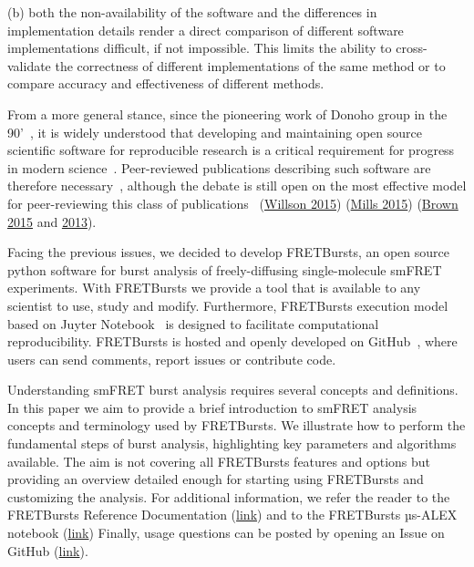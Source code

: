 (b) both the non-availability of the software and the differences in implementation 
details render a direct comparison of different software implementations difficult, 
if not impossible. 
This limits the ability to cross-validate the correctness of different 
implementations of the same method or to compare accuracy and effectiveness
of different methods.

From a more general stance, since the pioneering work of Donoho group in the 90'~\cite{Buckheit_1995}, 
it is widely understood that developing and maintaining open source scientific software
for reproducible research is a critical requirement for progress in modern 
science~\cite{Ince_2012,Vihinen_2015}. Peer-reviewed publications describing such software are therefore necessary~\cite{Pradal_2013}, 
although the debate is still open on the most effective model for peer-reviewing this
class of publications~\cite{Check_Hayden_2013,Check_Hayden_2015} 
(\href{https://software-carpentry.org/blog/2015/04/quality-is-free-getting-there-isnt.html}{Willson 2015})
(\href{http://https://www.mozillascience.org/effective-code-review-for-journals}{Mills 2015})
(\href{http://http://ivory.idyll.org/blog/2015-we-live-in-a-bubble.html}{Brown 2015} and \href{http://http://ivory.idyll.org/blog/on-code-review-of-scientific-code.html}{2013}).

Facing the previous issues, we decided to develop FRETBursts, 
an open source python software for burst analysis of freely-diffusing
single-molecule smFRET experiments. 
With FRETBursts we provide a tool that is available to any scientist
to use, study and modify. Furthermore, FRETBursts execution model 
based on Juyter Notebook~\cite{Shen_2014} is designed to facilitate 
computational reproducibility. 
FRETBursts is hosted and openly developed on GitHub~\cite{Blischak_2016,Prli__2012}, 
where users can send comments, report issues or contribute code.

Understanding smFRET burst analysis requires several concepts and definitions.
In this paper we aim to provide a brief introduction to smFRET analysis concepts
and terminology used by FRETBursts. We illustrate how to perform
the fundamental steps of burst analysis, highlighting key parameters
and algorithms available. The aim is not covering all FRETBursts
features and options but providing an overview detailed enough for starting
using FRETBursts and customizing the analysis. For additional information, 
we refer the reader to the FRETBursts Reference Documentation
(\href{http://fretbursts.readthedocs.org/}{link}) and to
the FRETBursts µs-ALEX notebook
(\href{http://nbviewer.ipython.org/github/tritemio/FRETBursts_notebooks/blob/master/notebooks/FRETBursts\%20-\%20us-ALEX\%20smFRET\%20burst\%20analysis.ipynb}{link})
Finally, usage questions can be posted by  opening an Issue
on GitHub (\href{https://github.com/tritemio/FRETBursts}{link}).

